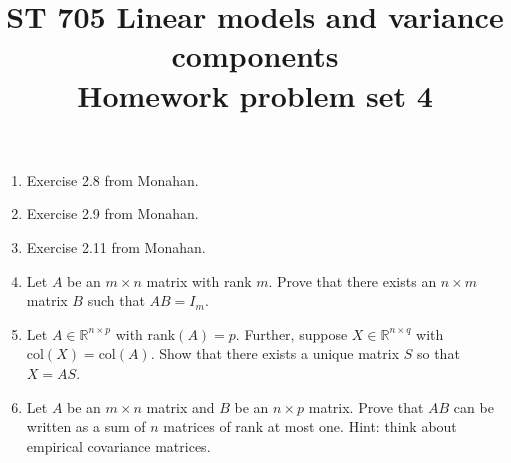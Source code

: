 \documentclass[11pt]{article}
\title{ST 705 Linear models and variance components \\ 
        Homework problem set 4}
\begin{document}
\maketitle

\begin{enumerate}

\item Exercise 2.8 from Monahan.

\item Exercise 2.9 from Monahan.

\item Exercise 2.11 from Monahan.

\item Let $A$ be an $m\times n$ matrix with rank $m$.  Prove that there exists an $n\times m$ matrix $B$ such that $AB = I_{m}$.

\item Let $A \in \mathbb{R}^{n\times p}$ with rank$(A) = p$.  Further, suppose  $X \in \mathbb{R}^{n\times q}$ with $\text{col}(X) = \text{col}(A)$.  Show that there exists a unique matrix $S$ so that $X = AS$.

\item Let $A$ be an $m\times n$ matrix and $B$ be an $n\times p$ matrix.  Prove that $AB$ can be written as a sum of $n$ matrices of rank at most one.  Hint: think about empirical covariance matrices.



\end{enumerate}
\end{document}
